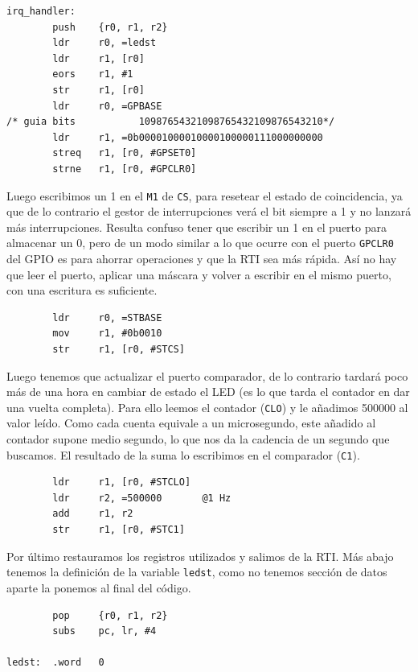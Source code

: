 \begin{lstlisting}
irq_handler:
        push    {r0, r1, r2}
        ldr     r0, =ledst
        ldr     r1, [r0]
        eors    r1, #1
        str     r1, [r0]
        ldr     r0, =GPBASE
/* guia bits           10987654321098765432109876543210*/
        ldr     r1, =0b00001000010000100000111000000000
        streq   r1, [r0, #GPSET0]
        strne   r1, [r0, #GPCLR0]
\end{lstlisting}

Luego escribimos un 1 en el {\tt M1} de {\tt CS}, para resetear el estado de coincidencia, ya
que de lo contrario el gestor de interrupciones verá el bit siempre a 1 y no lanzará más
interrupciones. Resulta confuso tener que escribir un 1 en el puerto para almacenar un 0, pero
de un modo similar a lo que ocurre con el puerto {\tt GPCLR0} del GPIO es para ahorrar
operaciones y que la RTI sea más rápida. Así no hay que leer el puerto, aplicar una máscara y
volver a escribir en el mismo puerto, con una escritura es suficiente.

\begin{lstlisting}
        ldr     r0, =STBASE
        mov     r1, #0b0010
        str     r1, [r0, #STCS]
\end{lstlisting}

Luego tenemos que actualizar el puerto comparador, de lo contrario tardará poco más
de una hora en cambiar de estado el LED (es lo que tarda el contador en dar una vuelta
completa). Para ello leemos el contador ({\tt CLO}) y le añadimos 500000 al valor leído. Como cada
cuenta equivale a un microsegundo, este añadido al contador supone medio segundo, lo
que nos da la cadencia de un segundo que buscamos. El resultado de la suma lo escribimos
en el comparador ({\tt C1}).

\begin{lstlisting}
        ldr     r1, [r0, #STCLO]
        ldr     r2, =500000       @1 Hz
        add     r1, r2
        str     r1, [r0, #STC1]
\end{lstlisting}

Por último restauramos los registros utilizados y salimos de la RTI. Más abajo tenemos la
definición de la variable {\tt ledst}, como no tenemos sección de datos aparte la ponemos
al final del código.

\begin{lstlisting}
        pop     {r0, r1, r2}
        subs    pc, lr, #4

ledst:  .word   0
\end{lstlisting}

